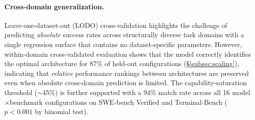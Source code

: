 {\paragraph{Cross-domain generalization.} 
Leave-one-dataset-out (LODO) cross-validation highlights the challenge of predicting \emph{absolute} success rates across structurally diverse task domains with a single regression surface that contains no dataset-specific parameters. 
However, within-domain cross-validated evaluation shows that the model correctly identifies the optimal architecture for 87\% of held-out configurations (\S\ref{subsec:scaling}), indicating that \emph{relative} performance rankings between architectures are preserved even when absolute cross-domain prediction is limited. 
The capability-saturation threshold ($\sim$45\%) is further supported with a 94\% match rate across all 16 model$\times$benchmark configurations on SWE-bench Verified and Terminal-Bench ($p < 0.001$ by binomial test).
}

